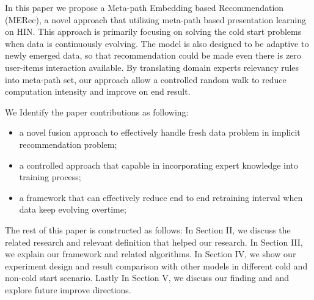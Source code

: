 In this paper we propose a Meta-path Embedding based Recommendation (MERec), a novel approach that utilizing meta-path based presentation learning on HIN. This approach is primarily focusing on solving the cold start problems when data is continuously evolving. The model is also designed to be adaptive to newly emerged data, so that recommendation could be made even there is zero user-items interaction available. By translating domain experts relevancy rules into meta-path set, our approach allow a controlled random walk to reduce computation intensity and improve on end result. 

We Identify the paper contributions as following:
\begin{itemize}
    \item a novel fusion approach to effectively handle fresh data problem in implicit recommendation problem;
    \item a controlled approach that capable in incorporating expert knowledge into training process;
    \item a framework that can effectively reduce end to end retraining interval when data keep evolving overtime;
\end{itemize}

The rest of this paper is constructed as follows: In Section II, we discuss the related research and relevant definition that helped our research. In Section III, we explain our framework and related algorithms. In Section IV, we show our experiment design and result comparison with other models in different cold and non-cold start scenario. Lastly In Section V, we discuss our finding and and explore future improve directions.